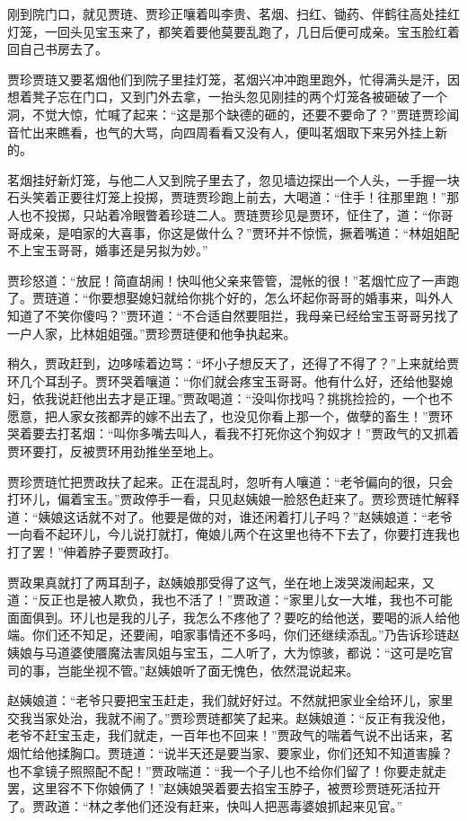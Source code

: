 \documentclass[12pt,oneside]{book}
\begin{document}
刚到院门口，就见贾琏、贾珍正嚷着叫李贵、茗烟、扫红、锄药、伴鹤往高处挂红灯笼，一回头见宝玉来了，都笑着要他莫要乱跑了，几日后便可成亲。宝玉脸红着回自己书房去了。

贾珍贾琏又要茗烟他们到院子里挂灯笼，茗烟兴冲冲跑里跑外，忙得满头是汗，因想着凳子忘在门口，又到门外去拿，一抬头忽见刚挂的两个灯笼各被砸破了一个洞，不觉大惊，忙喊了起来：“这是那个缺德的砸的，还要不要命了？”贾琏贾珍闻音忙出来瞧看，也气的大骂，向四周看看又没有人，便叫茗烟取下来另外挂上新的。

茗烟挂好新灯笼，与他二人又到院子里去了，忽见墙边探出一个人头，一手握一块石头笑着正要往灯笼上投掷，贾琏贾珍跑上前去，大喝道：“住手！往那里跑！”那人也不投掷，只站着冷眼瞥着珍琏二人。贾琏贾珍见是贾环，怔住了，道：“你哥哥成亲，是咱家的大喜事，你这是做什么？”贾环并不惊慌，撅着嘴道：“林姐姐配不上宝玉哥哥，婚事还是另拟为妙。”

贾珍怒道：“放屁！简直胡闹！快叫他父亲来管管，混帐的很！”茗烟忙应了一声跑了。贾琏道：“你要想娶媳妇就给你挑个好的，怎么坏起你哥哥的婚事来，叫外人知道了不笑你傻吗？”贾环道：“不合适自然要阻拦，我母亲已经给宝玉哥哥另找了一户人家，比林姐姐强。”贾珍贾琏便和他争执起来。

稍久，贾政赶到，边哆嗦着边骂：“坏小子想反天了，还得了不得了？”上来就给贾环几个耳刮子。贾环哭着嚷道：“你们就会疼宝玉哥哥。他有什么好，还给他娶媳妇，依我说赶他出去才是正理。”贾政喝道：“没叫你找吗？挑挑捡捡的，一个也不愿意，把人家女孩都弄的嫁不出去了，也没见你看上那一个，做孽的畜生！”贾环哭着要去打茗烟：“叫你多嘴去叫人，看我不打死你这个狗奴才！”贾政气的又抓着贾环要打，反被贾环用劲推坐至地上。

贾珍贾琏忙把贾政扶了起来。正在混乱时，忽听有人嚷道：“老爷偏向的很，只会打环儿，偏着宝玉。”贾政停手一看，只见赵姨娘一脸怒色赶来了。贾珍贾琏忙解释道：“姨娘这话就不对了。他要是做的对，谁还闲着打儿子吗？”赵姨娘道：“老爷一向看不起环儿，今儿说打就打，俺娘儿两个在这里也待不下去了，你要打连我也打了罢！”伸着脖子要贾政打。

贾政果真就打了两耳刮子，赵姨娘那受得了这气，坐在地上泼哭泼闹起来，又道：“反正也是被人欺负，我也不活了！”贾政道：“家里儿女一大堆，我也不可能面面俱到。环儿也是我的儿子，我怎么不疼他了？要吃的给他送，要喝的派人给他端。你们还不知足，还要闹，咱家事情还不多吗，你们还继续添乱。”乃告诉珍琏赵姨娘与马道婆使餍魔法害凤姐与宝玉，二人听了，大为惊骇，都说：“这可是吃官司的事，岂能坐视不管。”赵姨娘听了面无愧色，依然混说起来。

赵姨娘道：“老爷只要把宝玉赶走，我们就好好过。不然就把家业全给环儿，家里交我当家处治，我就不闹了。”贾珍贾琏都笑了起来。赵姨娘道：“反正有我没他，老爷不赶宝玉走，我们就走，一百年也不回来！”贾政气的喘着气说不出话来，茗烟忙给他揉胸口。贾琏道：“说半天还是要当家、要家业，你们还知不知道害臊？也不拿镜子照照配不配！”贾政喘道：“我一个子儿也不给你们留了！你要走就走罢，这里容不下你娘俩了！”赵姨娘哭着要去掐宝玉脖子，被贾珍贾琏死活拉开了。贾政道：“林之孝他们还没有赶来，快叫人把恶毒婆娘抓起来见官。”
\end{document}
